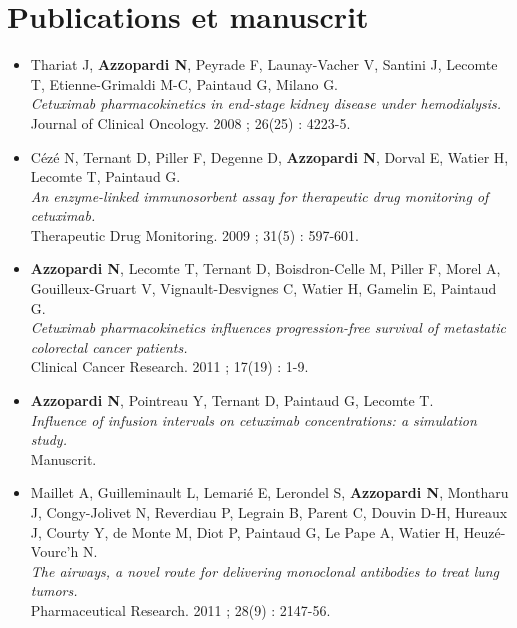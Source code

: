 \chapter*{Publications et manuscrit}

\begin{itemize}
\item Thariat J, \textbf{Azzopardi N}, Peyrade F, Launay-Vacher V, Santini J, Lecomte T, Etienne-Grimaldi M-C, Paintaud G, Milano G.\\
\textit{Cetuximab pharmacokinetics in end-stage kidney disease under hemodialysis.}\\
Journal of Clinical Oncology. 2008 ; 26(25) : 4223-5.
\\
\item Cézé N, Ternant D, Piller F, Degenne D, \textbf{Azzopardi N}, Dorval E, Watier H, Lecomte T, Paintaud G.\\
\textit{An enzyme-linked immunosorbent assay for therapeutic drug monitoring of cetuximab.}\\
Therapeutic Drug Monitoring. 2009 ; 31(5) : 597-601.
\\
\item \textbf{Azzopardi N}, Lecomte T, Ternant D, Boisdron-Celle M, Piller F, Morel A, Gouilleux-Gruart V, Vignault-Desvignes C, Watier H, Gamelin E, Paintaud G.\\
\textit{Cetuximab pharmacokinetics influences progression-free survival of metastatic colorectal cancer patients.}\\
Clinical Cancer Research. 2011 ; 17(19) : 1-9.
\\
\item \textbf{Azzopardi N}, Pointreau Y, Ternant D, Paintaud G, Lecomte T.\\
\textit{Influence of infusion intervals on cetuximab concentrations: a simulation study.}\\
Manuscrit.
\\
\item Maillet A, Guilleminault L, Lemarié E, Lerondel S, \textbf{Azzopardi N}, Montharu J, Congy-Jolivet N, Reverdiau P, Legrain B, Parent C, Douvin D-H, Hureaux J, Courty Y, de Monte M, Diot P, Paintaud G, Le Pape A, Watier H, Heuzé-Vourc'h N.\\
\textit{The airways, a novel route for delivering monoclonal antibodies to treat lung tumors.}\\
Pharmaceutical Research. 2011 ; 28(9) : 2147-56.
\end{itemize}